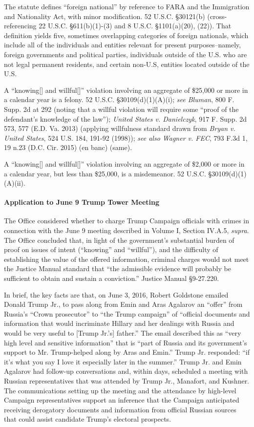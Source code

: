 The statute defines ``foreign national'' by reference to FARA and the Immigration and Nationality Act, with minor modification.
52 U.S.C. \S 30121(b) (cross-referencing 22 U.S.C. \S 611(b)(1)-(3) and 8 U.S.C. \S 1101(a)(20), (22)).
That definition yields five, sometimes overlapping categories of foreign nationals, which include all of the individuals and entities relevant for present purposes--namely, foreign governments and political parties, individuals outside of the U.S. who are not legal permanent residents, and certain non-U.S, entities located outside of the U.S.

A ``knowing[] and willful[]'' violation involving an aggregate of \$25,000 or more in a calendar year is a felony.
52 U.S.C. \S 30109(d)(1)(A)(i); \textit{see Bluman}, 800 F. Supp. 2d at 292 (noting that a willful violation will require some ``proof of the defendant's knowledge of the law''); \textit{United States v. Danielczyk}, 917 F. Supp. 2d 573, 577 (E.D. Va. 2013) (applying willfulness standard drawn from \textit{Bryan v. United States}, 524 U.S. 184, 191-92 (1998)); \textit{see also Wagner v. FEC}, 793 F.3d 1, 19 n.23 (D.C. Cir. 2015) (en banc) (same).

A ``knowing[] and willful[]'' violation involving an aggregate of \$2,000 or more in a calendar year, but less than \$25,000, is a misdemeanor.
52 U.S.C. \S 30109(d)(1)(A)(ii).

\paragraph{Application to June 9 Trump Tower Meeting}
The Office considered whether to charge Trump Campaign officials with crimes in connection with the June 9 meeting described in Volume I, Section IV.A.5, \textit{supra}.
The Office concluded that, in light of the government's substantial burden of proof on issues of intent (``knowing'' and ``willful''), and the difficulty of establishing the value of the offered information, criminal charges would not meet the Justice Manual standard that ``the admissible evidence will probably be sufficient to obtain and sustain a conviction.''
Justice Manual \S 9-27.220.

In brief, the key facts are that, on June 3, 2016, Robert Goldstone emailed Donald Trump Jr., to pass along from Emin and Aras Agalarov an ``offer'' from Russia's ``Crown prosecutor'' to ``the Trump campaign'' of ``official documents and information that would incriminate Hillary and her dealings with Russia and would be very useful to [Trump Jr.'s] father.''
The email described this as ``very high level and sensitive information'' that is ``part of Russia and its government's support to Mr. Trump-helped along by Aras and Emin.''
Trump Jr. responded: ``if it's what you say I love it especially later in the summer.''
Trump Jr. and Emin Agalarov had follow-up conversations and, within days, scheduled a meeting with Russian representatives that was attended by Trump Jr., Manafort, and Kushner.
The communications setting up the meeting and the attendance by high-level Campaign representatives support an inference that the Campaign anticipated receiving derogatory documents and information from official Russian sources that could assist candidate Trump's electoral prospects.

